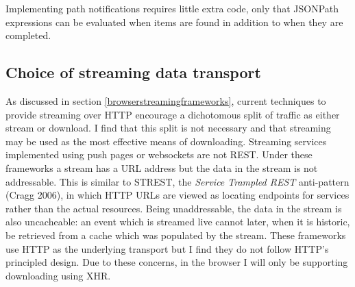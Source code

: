 \documentclass[12pt, ]{article}
\begin{document}
Implementing path notifications requires little extra code, only that
JSONPath expressions can be evaluated when items are found in addition
to when they are completed.

\subsection{Choice of streaming data
transport}\label{choice-of-streaming-data-transport}

As discussed in section \ref{browserstreamingframeworks}, current
techniques to provide streaming over HTTP encourage a dichotomous split
of traffic as either stream or download. I find that this split is not
necessary and that streaming may be used as the most effective means of
downloading. Streaming services implemented using push pages or
websockets are not REST. Under these frameworks a stream has a URL
address but the data in the stream is not addressable. This is similar
to STREST, the \emph{Service Trampled REST} anti-pattern (Cragg 2006),
in which HTTP URLs are viewed as locating endpoints for services rather
than the actual resources. Being unaddressable, the data in the stream
is also uncacheable: an event which is streamed live cannot later, when
it is historic, be retrieved from a cache which was populated by the
stream. These frameworks use HTTP as the underlying transport but I find
they do not follow HTTP's principled design. Due to these concerns, in
the browser I will only be supporting downloading using XHR.
\end{document}
